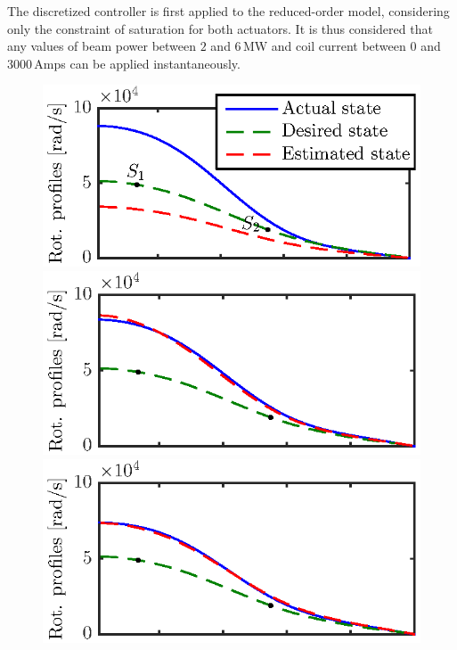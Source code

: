 \documentclass[12pt]{iopart}
\begin{document}
The discretized controller is first applied to the reduced-order model, considering only the constraint of saturation for both actuators. It is thus considered that any values of beam power between $2$ and $6$\,MW and coil current between $0$ and $3000$\,Amps can be applied instantaneously.   

\begin{figure}
	\centering
	\includegraphics{imene_figs/fig14a} \\[-0.3em] %
	\includegraphics{imene_figs/fig14b} \\[-0.3em] %
	\includegraphics{imene_figs/fig14c} \\[-0.3em] %

\end{figure}
\end{document}
